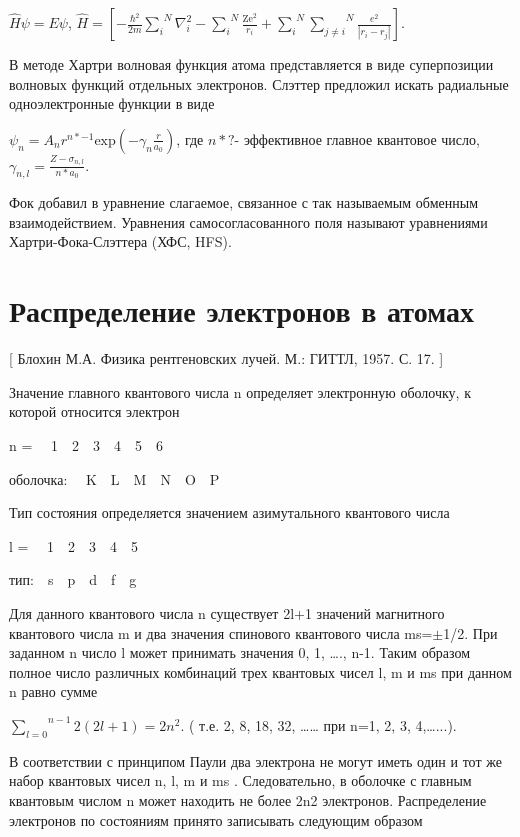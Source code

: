 \documentclass[a4paper,14pt, openany, twoside, draft]{extbook} %
\begin{document}
 $\hat H\psi =\mathit{E\psi }$,   $\hat H=\left[-\frac{\hbar ^2}{2m}\overset N{\underset i{\sum }}\nabla _i^2-\overset N{\underset i{\sum }}\frac{{\text{Ze}}^2}{r_i}+\overset N{\underset i{\sum }}\overset N{\underset{j\neq i}{\sum }}\frac{e^2}{|r_i-r_j|}\right]$.

В методе Хартри волновая функция атома представляется в виде суперпозиции волновых функций отдельных электронов. Слэттер предложил искать радиальные одноэлектронные функции в виде

 $\psi _n=A_nr^{n\ast -1}\text{exp}(-\gamma _n\frac r{a_0})$, где  $n\ast ?${}- эффективное главное квантовое число,  $\gamma _{n,l}=\frac{Z-\sigma _{n,l}}{n\ast a_0}$.

Фок добавил в уравнение слагаемое, связанное с так называемым обменным взаимодействием. Уравнения самосогласованного поля называют уравнениями Хартри-Фока-Слэттера (ХФС, HFS).

\section{Распределение электронов в атомах}
\label{sec:electron-in-athoms}
[ Блохин М.А. Физика рентгеновских лучей. М.: ГИТТЛ, 1957. С. 17. ]

Значение главного квантового числа n определяет электронную оболочку, к которой относится электрон

n = \ \ 1\ \ 2\ \ 3\ \ 4\ \ 5\ \ 6

оболочка: \ \ K\ \ L\ \ M\ \ N\ \ O\ \ P

Тип состояния определяется значением азимутального квантового числа

l = \ \ 1\ \ 2\ \ 3\ \ 4\ \ 5

тип:\ \ s\ \ p\ \ d\ \ f\ \ g\ \

Для данного квантового числа n  существует 2l+1 значений магнитного квантового числа m и два значения спинового квантового числа ms=${\pm}$1/2. При заданном n число l может принимать значения 0, 1, …., n{}-1. Таким образом полное число различных комбинаций трех квантовых чисел l, m и ms при данном n равно сумме

 $\overset{n-1}{\underset{l=0}{\sum }}2(2l+1)=2n^2$.  ( т.е. 2, 8, 18, 32, …… при n=1, 2, 3, 4,…...).

В соответствии с принципом Паули два электрона не могут иметь один и тот же набор квантовых чисел  n, l, m и ms . Следовательно, в оболочке с главным квантовым числом n может находить не более 2n2 электронов. Распределение электронов по состояниям принято записывать следующим образом
\end{document}
